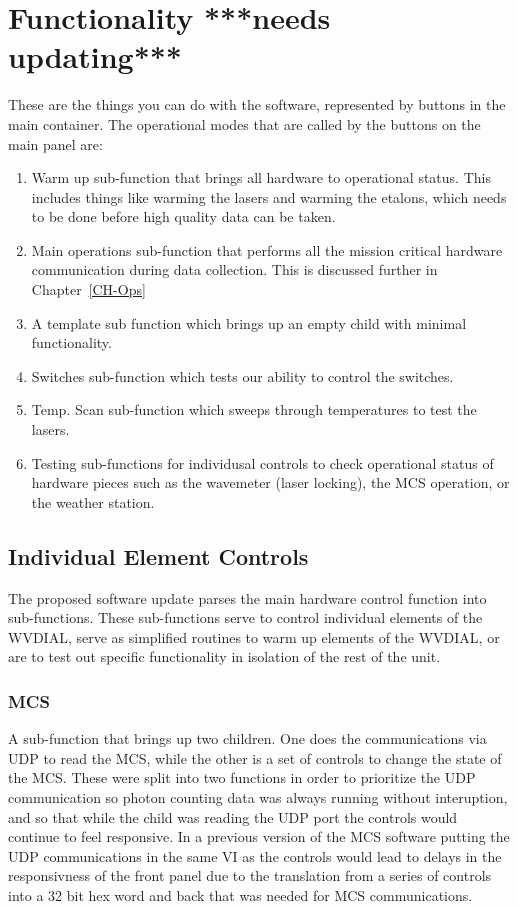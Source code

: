 
\chapter{Functionality ***needs updating***}
\label{CH-Functions}

These are the things you can do with the software, represented by buttons in the main container. The operational modes that are called by the buttons on the main panel are:

\begin{enumerate}
\item{Warm up sub-function that brings all hardware to operational status. This includes things like warming the lasers and warming the etalons, which needs to be done before high quality data can be taken.}
\item{Main operations sub-function that performs all the mission critical hardware communication during data collection. This is discussed further in Chapter~\ref{CH-Ops}}
\item{A template sub function which brings up an empty child with minimal functionality.}
\item{Switches sub-function which tests our ability to control the switches.}
\item{Temp. Scan sub-function which sweeps through temperatures to test the lasers.}
\item{Testing sub-functions for individusal controls to check operational status of hardware pieces such as the wavemeter (laser locking), the MCS operation, or the weather station.}
\end{enumerate}

\section{Individual Element Controls}
The proposed software update parses the main hardware control function into sub-functions. These sub-functions serve to control individual elements of the WVDIAL, serve as simplified routines to warm up elements of the WVDIAL, or are to test out specific functionality in isolation of the rest of the unit. 

\subsection{MCS}\label{Sec:MCSSubFunction}

A sub-function that brings up two children. One does the communications via UDP to read the MCS, while the other is a set of controls to change the state of the MCS. These were split into two functions in order to prioritize the UDP communication so photon counting data was always running without interuption, and so that while the child was reading the UDP port the controls would continue to feel responsive. In a previous version of the MCS software putting the UDP communications in the same VI as the controls would lead to delays in the responsivness of the front panel due to the translation from a series of controls into a 32 bit hex word and back that was needed for MCS communications. 

